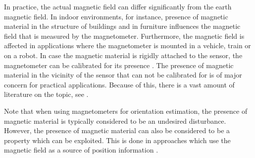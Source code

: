 
In practice, the actual magnetic field can differ significantly from the earth magnetic field. In indoor environments, for instance, presence of magnetic material in the structure of buildings and in furniture influences the magnetic field that is measured by the magnetometer. Furthermore, the magnetic field is affected in applications where the magnetometer is mounted in \eg a vehicle, train or on a robot. In case the magnetic material is rigidly attached to the sensor, the magnetometer can be calibrated for its presence \citep{kokS:2016,vasconcelosESOC:2011,renaudinAL:2010,salehiMB:2012}. The presence of magnetic material in the vicinity of the sensor that can not be calibrated for is of major concern for practical applications. Because of this, there is a vast amount of literature on the topic, see \eg \cite{callmer:2013,ligorioS:2016,roetenbergLBV:2005}. 

Note that when using magnetometers for orientation estimation, the presence of magnetic material is typically considered to be an undesired disturbance. However, the presence of magnetic material can also be considered to be a property which can be exploited. This is done in approaches which use the magnetic field as a source of position information \citep{solinKWSS:2015,haverinenK:2009,robertsonFADJPKLB:2013}.


